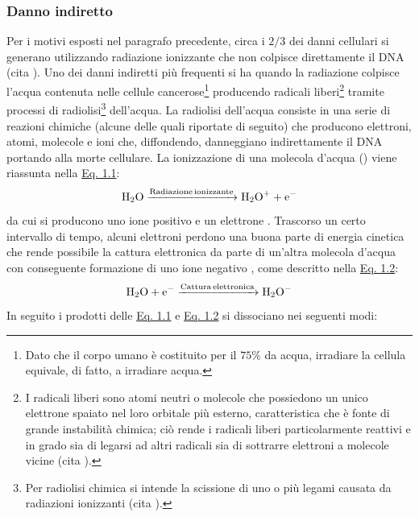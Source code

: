 \documentclass[12pt,a4paper,twoside]{report}
\begin{document}
	\subsubsection{Danno indiretto}\label{par:danno_indiretto}
	Per i motivi esposti nel paragrafo precedente, circa i $2/3$ dei danni cellulari si generano utilizzando radiazione ionizzante che non colpisce direttamente il DNA (cita
	). Uno dei danni indiretti più frequenti si ha quando la radiazione colpisce l'acqua contenuta nelle cellule cancerose\footnote{Dato che il corpo umano è costituito per il $75\%$ da acqua, irradiare la cellula equivale, di fatto, a irradiare acqua.} producendo radicali liberi\footnote{I radicali liberi sono atomi neutri o molecole che possiedono un unico elettrone spaiato nel loro orbitale più esterno, caratteristica che è fonte di grande instabilità chimica; ciò rende i radicali liberi particolarmente reattivi e in grado sia di legarsi ad altri radicali sia di sottrarre elettroni a molecole vicine (cita
	).} tramite processi di radiolisi\footnote{Per radiolisi chimica si intende la scissione di uno o più legami causata da radiazioni ionizzanti (cita
	).} dell'acqua. La radiolisi dell'acqua consiste in una serie di reazioni chimiche (alcune delle quali riportate di seguito) che producono elettroni, atomi, molecole e ioni che, diffondendo, danneggiano indirettamente il DNA portando alla morte cellulare. La ionizzazione di una molecola d'acqua () viene riassunta nella \hyperref[eq:radiolisi1]{Eq. 1.1}:
	\begin{equation}
		\ce{H2O ->[Radiazione ionizzante] H2O^{+} + e^-}
		\label{eq:radiolisi1}
	\end{equation}
	da cui si producono uno ione positivo  e un elettrone . Trascorso un certo intervallo di tempo, alcuni elettroni perdono una buona parte di energia cinetica che rende possibile la cattura elettronica da parte di un'altra molecola d'acqua con conseguente formazione di uno ione negativo , come descritto nella \hyperref[eq:radiolisi2]{Eq. 1.2}:
	\begin{equation}
		\ce{H2O + e^{-} ->[Cattura elettronica] H2O^{-}}
		\label{eq:radiolisi2}
	\end{equation}
	In seguito i prodotti delle \hyperref[eq:radiolisi1]{Eq. 1.1} e \hyperref[eq:radiolisi2]{Eq. 1.2} si dissociano nei seguenti modi:
\end{document}
